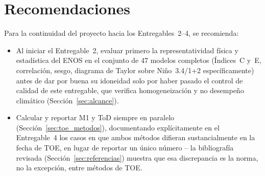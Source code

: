 \documentclass[11pt,a4paper]{article}
\begin{document}
\section{Recomendaciones}
\label{sec:recomendaciones}

Para la continuidad del proyecto hacia los Entregables~2--4, se recomienda:

\begin{itemize}
\item Al iniciar el Entregable~2, evaluar primero la representatividad f\'isica y estad\'istica del ENOS en el conjunto de 47 modelos completos (\'Indices~C y~E, correlaci\'on, sesgo, diagrama de Taylor sobre Ni\~no~3.4/1+2 espec\'ificamente) antes de dar por buena su idoneidad solo por haber pasado el control de calidad de este entregable, que verifica homogeneizaci\'on y no desempe\~no clim\'atico (Secci\'on~\ref{sec:alcance}).
\item Calcular y reportar M1 y ToD siempre en paralelo (Secci\'on~\ref{sec:toe_metodos}), documentando expl\'icitamente en el Entregable~4 los casos en que ambos m\'etodos difieran sustancialmente en la fecha de TOE, en lugar de reportar un \'unico n\'umero -- la bibliograf\'ia revisada (Secci\'on~\ref{sec:referencias}) muestra que esa discrepancia es la norma, no la excepci\'on, entre m\'etodos de TOE.
\end{itemize}

\newpage


\end{document}
